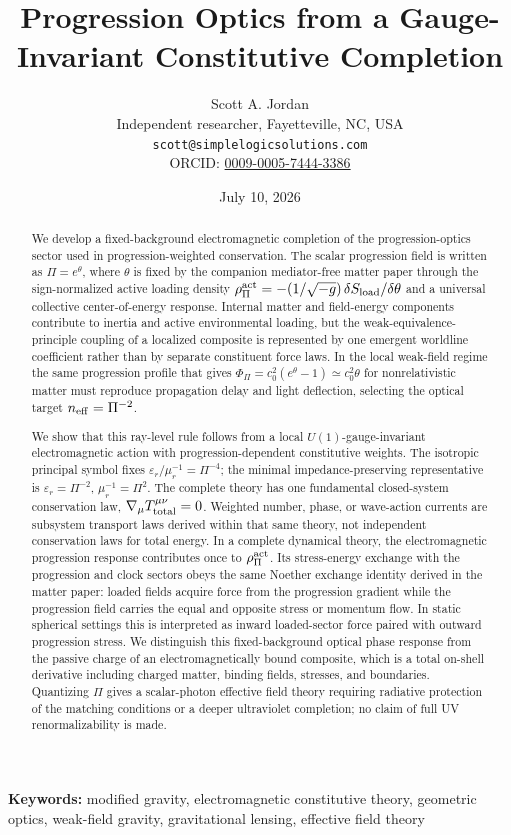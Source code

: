 \documentclass[12pt]{article}
\title{Progression Optics from a Gauge-Invariant Constitutive Completion}
\author{Scott A. Jordan\\
Independent researcher, Fayetteville, NC, USA\\
\texttt{scott@simplelogicsolutions.com}\\
ORCID: \href{https://orcid.org/0009-0005-7444-3386}{0009-0005-7444-3386}}
\date{July 10, 2026}
\begin{document}
\maketitle

\begin{abstract}
We develop a fixed-background electromagnetic completion of the progression-optics sector used in progression-weighted conservation.  The scalar progression field is written as \(\Pi=e^{\theta}\), where \(\theta\) is fixed by the companion mediator-free matter paper through the sign-normalized active loading density \(\rho_\Pi^{\rm act}=-(1/\sqrt{-g})\,\delta S_{\rm load}/\delta\theta\) and a universal collective center-of-energy response.  Internal matter and field-energy components contribute to inertia and active environmental loading, but the weak-equivalence-principle coupling of a localized composite is represented by one emergent worldline coefficient rather than by separate constituent force laws.  In the local weak-field regime the same progression profile that gives \(\Phi_\Pi=c_0^2(e^\theta-1)\simeq c_0^2\theta\) for nonrelativistic matter must reproduce propagation delay and light deflection, selecting the optical target \(n_{\rm eff}=\Pi^{-2}\).

We show that this ray-level rule follows from a local \(U(1)\)-gauge-invariant electromagnetic action with progression-dependent constitutive weights.  The isotropic principal symbol fixes \(\varepsilon_r/\mu_r^{-1}=\Pi^{-4}\); the minimal impedance-preserving representative is \(\varepsilon_r=\Pi^{-2}\), \(\mu_r^{-1}=\Pi^2\).  The complete theory has one fundamental closed-system conservation law, \(\nabla_\mu T_{\rm total}^{\mu\nu}=0\).  Weighted number, phase, or wave-action currents are subsystem transport laws derived within that same theory, not independent conservation laws for total energy.  In a complete dynamical theory, the electromagnetic progression response contributes once to \(\rho_\Pi^{\rm act}\).  Its stress-energy exchange with the progression and clock sectors obeys the same Noether exchange identity derived in the matter paper: loaded fields acquire force from the progression gradient while the progression field carries the equal and opposite stress or momentum flow.  In static spherical settings this is interpreted as inward loaded-sector force paired with outward progression stress.  We distinguish this fixed-background optical phase response from the passive charge of an electromagnetically bound composite, which is a total on-shell derivative including charged matter, binding fields, stresses, and boundaries.  Quantizing \(\Pi\) gives a scalar-photon effective field theory requiring radiative protection of the matching conditions or a deeper ultraviolet completion; no claim of full UV renormalizability is made.
\end{abstract}
\noindent\textbf{Keywords:} modified gravity, electromagnetic constitutive theory, geometric optics, weak-field gravity, gravitational lensing, effective field theory
\end{document}
